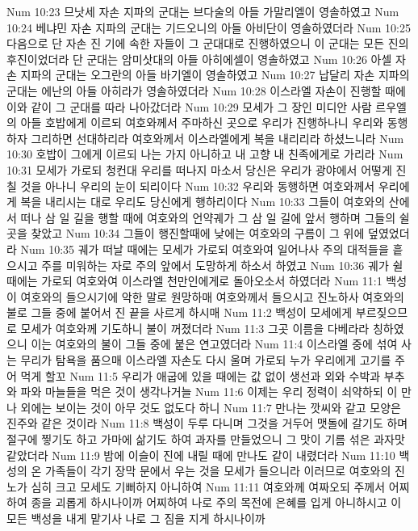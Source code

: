 Num 10:23  므낫세 자손 지파의 군대는 브다술의 아들 가말리엘이 영솔하였고
Num 10:24  베냐민 자손 지파의 군대는 기드오니의 아들 아비단이 영솔하였더라
Num 10:25  다음으로 단 자손 진 기에 속한 자들이 그 군대대로 진행하였으니 이 군대는 모든 진의 후진이었더라 단 군대는 암미삿대의 아들 아히에셀이 영솔하였고
Num 10:26  아셀 자손 지파의 군대는 오그란의 아들 바기엘이 영솔하였고
Num 10:27  납달리 자손 지파의 군대는 에난의 아들 아히라가 영솔하였더라
Num 10:28  이스라엘 자손이 진행할 때에 이와 같이 그 군대를 따라 나아갔더라
Num 10:29  모세가 그 장인 미디안 사람 르우엘의 아들 호밥에게 이르되 여호와께서 주마하신 곳으로 우리가 진행하나니 우리와 동행하자 그리하면 선대하리라 여호와께서 이스라엘에게 복을 내리리라 하셨느니라
Num 10:30  호밥이 그에게 이르되 나는 가지 아니하고 내 고향 내 친족에게로 가리라
Num 10:31  모세가 가로되 청컨대 우리를 떠나지 마소서 당신은 우리가 광야에서 어떻게 진 칠 것을 아나니 우리의 눈이 되리이다
Num 10:32  우리와 동행하면 여호와께서 우리에게 복을 내리시는 대로 우리도 당신에게 행하리이다
Num 10:33  그들이 여호와의 산에서 떠나 삼 일 길을 행할 때에 여호와의 언약궤가 그 삼 일 길에 앞서 행하며 그들의 쉴 곳을 찾았고
Num 10:34  그들이 행진할때에 낮에는 여호와의 구름이 그 위에 덮였었더라
Num 10:35  궤가 떠날 때에는 모세가 가로되 여호와여 일어나사 주의 대적들을 흩으시고 주를 미워하는 자로 주의 앞에서 도망하게 하소서 하였고
Num 10:36  궤가 쉴 때에는 가로되 여호와여 이스라엘 천만인에게로 돌아오소서 하였더라
Num 11:1  백성이 여호와의 들으시기에 악한 말로 원망하매 여호와께서 들으시고 진노하사 여호와의 불로 그들 중에 붙어서 진 끝을 사르게 하시매
Num 11:2  백성이 모세에게 부르짖으므로 모세가 여호와께 기도하니 불이 꺼졌더라
Num 11:3  그곳 이름을 다베라라 칭하였으니 이는 여호와의 불이 그들 중에 붙은 연고였더라
Num 11:4  이스라엘 중에 섞여 사는 무리가 탐욕을 품으매 이스라엘 자손도 다시 울며 가로되 누가 우리에게 고기를 주어 먹게 할꼬
Num 11:5  우리가 애굽에 있을 때에는 값 없이 생선과 외와 수박과 부추와 파와 마늘들을 먹은 것이 생각나거늘
Num 11:6  이제는 우리 정력이 쇠약하되 이 만나 외에는 보이는 것이 아무 것도 없도다 하니
Num 11:7  만나는 깟씨와 같고 모양은 진주와 같은 것이라
Num 11:8  백성이 두루 다니며 그것을 거두어 맷돌에 갈기도 하며 절구에 찧기도 하고 가마에 삶기도 하여 과자를 만들었으니 그 맛이 기름 섞은 과자맛 같았더라
Num 11:9  밤에 이슬이 진에 내릴 때에 만나도 같이 내렸더라
Num 11:10  백성의 온 가족들이 각기 장막 문에서 우는 것을 모세가 들으니라 이러므로 여호와의 진노가 심히 크고 모세도 기뻐하지 아니하여
Num 11:11  여호와께 여짜오되 주께서 어찌하여 종을 괴롭게 하시나이까 어찌하여 나로 주의 목전에 은혜를 입게 아니하시고 이 모든 백성을 내게 맡기사 나로 그 짐을 지게 하시나이까
